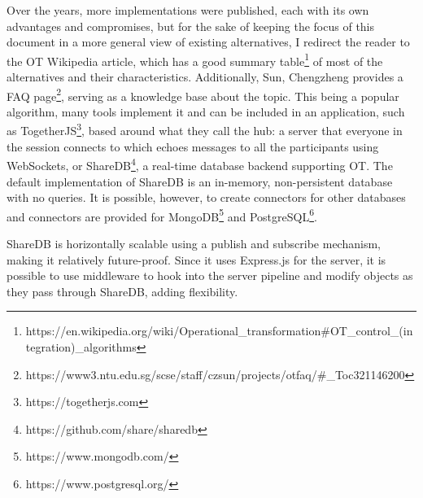 Over the years, more implementations were published, each with its own advantages and compromises, but for the sake of keeping the focus of this document in a more general view of existing alternatives, I redirect the reader to the OT Wikipedia article, which has a good summary table\footnote{https://en.wikipedia.org/wiki/Operational\_transformation\#OT\_control\_(integration)\_algorithms} of most of the alternatives and their characteristics. Additionally, Sun, Chengzheng provides a FAQ page\footnote{https://www3.ntu.edu.sg/scse/staff/czsun/projects/otfaq/\#\_Toc321146200}, serving as a knowledge base about the topic. This being a popular algorithm, many tools implement it and can be included in an application, such as TogetherJS\footnote{https://togetherjs.com}, based around what they call the hub: a server that everyone in the session connects to which echoes messages to all the participants using WebSockets, or ShareDB\footnote{https://github.com/share/sharedb}, a real-time database backend supporting OT. The default implementation of ShareDB is an in-memory, non-persistent database with no queries. It is possible, however, to create connectors for other databases and connectors are provided for MongoDB\footnote{https://www.mongodb.com/} and PostgreSQL\footnote{https://www.postgresql.org/}.

ShareDB is horizontally scalable using a publish and subscribe mechanism, making it relatively future-proof. Since it uses Express.js for the server, it is possible to use middleware to hook into the server pipeline and modify objects as they pass through ShareDB, adding flexibility.

